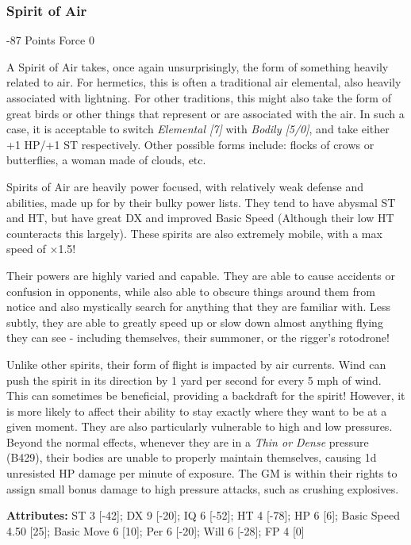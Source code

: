 \begin{multicols}{3}
	\subsubsection{Spirit of Air}
	\begin{flushright}
		 -87 Points Force 0
	\end{flushright}
	
	A Spirit of Air takes, once again unsurprisingly, the form of something heavily related to air. For hermetics, this is often a traditional air elemental, also heavily associated with lightning. For other traditions, this might also take the form of great birds or other things that represent or are associated with the air. In such a case, it is acceptable to switch \textit{Elemental [7]} with \textit{Bodily [5/0]}, and take either +1 HP/+1 ST respectively. Other possible forms include: flocks of crows or butterflies, a woman made of clouds, etc.
	
	Spirits of Air are heavily power focused, with relatively weak defense and abilities, made up for by their bulky power lists. They tend to have abysmal ST and HT, but have great DX and improved Basic Speed (Although their low HT counteracts this largely). These spirits are also extremely mobile, with a max speed of \(\times\)1.5!
	
	Their powers are highly varied and capable. They are able to cause accidents or confusion in opponents, while also able to obscure things around them from notice and also mystically search for anything that they are familiar with. Less subtly, they are able to greatly speed up or slow down almost anything flying they can see - including themselves, their summoner, or the rigger's rotodrone!
	
	Unlike other spirits, their form of flight is impacted by air currents. Wind can push the spirit in its direction by 1 yard per second for every 5 mph of wind. This can sometimes be beneficial, providing a backdraft for the spirit! However, it is more likely to affect their ability to stay exactly where they want to be at a given moment. They are also particularly vulnerable to high and low pressures. Beyond the normal effects, whenever they are in a \textit{Thin or Dense} pressure (B429), their bodies are unable to properly maintain themselves, causing 1d unresisted HP damage per minute of exposure. The GM is within their rights to assign small bonus damage to high pressure attacks, such as crushing explosives.
	
	\textbf{Attributes:}
	ST 3 [-42]; DX 9 [-20]; IQ 6 [-52]; HT 4 [-78]; HP 6 [6]; Basic Speed 4.50 [25]; Basic Move 6 [10]; Per 6 [-20]; Will 6 [-28]; FP 4 [0]
	

\end{multicols}
